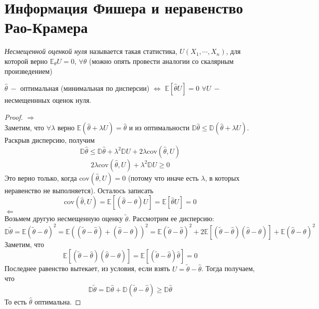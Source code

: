 \section{Информация Фишера и неравенство Рао-Крамера}
\begin{definition}
\textit{Несмещенной оценкой нуля} называется такая статистика, $U\left(X_1, \cdots, X_n\right)$, для которой верно $\mathbb{E}_\theta U = 0$, $\forall \theta$ (можно опять провести аналогии со скалярным произведением)
\end{definition}
\begin{statement}
$\widehat{\theta} \ - $ оптимальная (минимальная по дисперсии) $\Leftrightarrow$
$\mathbb{E}\left[\widehat{\theta} U\right] = 0$ $\forall U \ - $ несмещеннных оценок нуля.
\end{statement}
\begin{proof}
$\Rightarrow$
\\
Заметим, что $\forall \lambda$ верно $\mathbb{E}\left(\widehat{\theta} + \lambda U\right) = \widehat{\theta}$ и из оптимальности $\mathbb{D} \widehat{\theta} \leq \mathbb{D}\left(\widehat{\theta} + \lambda U\right)$. Раскрыв дисперсию, получим
\[
    \mathbb{D} \widehat{\theta} \leq \mathbb{D} \widehat{\theta} + \lambda ^ 2 \mathbb{D} U + 2 \lambda\text{cov}\left(\widehat{\theta}, U\right)
\]\[
    2\lambda\text{cov}\left(\widehat{\theta}, U\right) + \lambda ^ 2 \mathbb{D} U \geq 0
\]
Это верно только, когда $\text{cov}\left(\widehat{\theta}, U\right) = 0$ (потому что иначе есть $\lambda$, в которых неравенство не выполняется). Осталось записать
\[
    \text{cov}\left(\widehat{\theta}, U\right) = \mathbb{E} \left[\left(\widehat{\theta} - \theta\right) U\right] = \mathbb{E} \left[\widehat{\theta} U\right] = 0
\]
$\Leftarrow$ \\
Возьмем другую несмещенную оценку $\tilde{\theta}$. Рассмотрим ее дисперсию:
\[
    \mathbb{D} \tilde{\theta} = \mathbb{E}\left(\tilde{\theta} - \theta\right) ^ 2 = \mathbb{E} \left(\left(\tilde{\theta} - \widehat{\theta}\right) + \left(\widehat{\theta} - \theta\right)\right) ^ 2 = \mathbb{E}\left(\tilde{\theta} - \widehat{\theta}\right)^  2 + 2 \mathbb{E} \left[\left(\tilde{\theta} - \widehat{\theta}\right)\left(\widehat{\theta} - \theta\right)\right] + \mathbb{E}\left(\widehat{\theta} - \theta\right) ^ 2
\]
Заметим, что 
\[
    \mathbb{E} \left[\left(\tilde{\theta} - \widehat{\theta}\right)\left(\widehat{\theta} - \theta\right)\right] = \mathbb{E} \left[\left(\tilde{\theta} - \widehat{\theta}\right) \widehat{\theta}\right] = 0
\]
Последнее равенство вытекает, из условия, если взять $U = \tilde{\theta} - \widehat{\theta}$. Тогда получаем, что 
\[
    \mathbb{D}\tilde{\theta} = \mathbb{D} \widehat{\theta} + \mathbb{D} \left(\tilde{\theta} - \widehat{\theta}\right) \geq \mathbb{D} \widehat{\theta}
\]
То есть $\widehat{\theta}$ оптимальна.

\end{proof}

